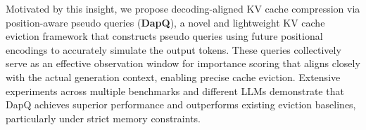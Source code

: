  
Motivated by this insight, we propose decoding-aligned KV cache compression via position-aware pseudo queries (\textbf{DapQ}), a novel and lightweight KV cache eviction framework that constructs pseudo queries using future positional encodings to accurately simulate the output tokens. These queries collectively serve as an effective observation window for importance scoring that aligns closely with the actual generation context, enabling precise cache eviction. Extensive experiments across multiple benchmarks and different LLMs demonstrate that DapQ achieves superior performance and outperforms existing eviction baselines, particularly under strict memory constraints. 
\label{sec:introduction}